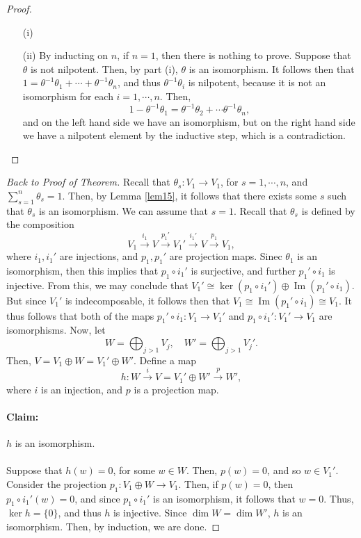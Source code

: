 \documentclass[a4paper]{report}
\theoremstyle{definition}
\theoremstyle{remark}
\theoremstyle{proposition}
\theoremstyle{conjecture}
\theoremstyle{lemma}
\theoremstyle{corollary}
\theoremstyle{exercise}
\theoremstyle{example}
\newcommand{\on}{\operatorname}
\begin{document}
\begin{proof}
    \leavevmode
    \begin{itemize}
        \item[(i)]
        \item[(ii)] By inducting on $n$, if $n=1$, then there is nothing
            to prove. Suppose that $\theta$ is not nilpotent.
            Then, by part (i), $\theta$ is an isomorphism.
            It follows then that 
            $1 = \theta^{-1}\theta_1 + \cdots + \theta^{-1}\theta_n$,
            and thus $\theta^{-1}\theta_i$ is nilpotent, because 
            it is not an isomorphism for each $i=1,\cdots,n$.
            Then, 
            $$1 - \theta^{-1}\theta_1 = \theta^{-1}\theta_2 + \cdots \theta^{-1}\theta_n,$$
            and on the left hand side we have an isomorphism, but on the right
            hand side we have a nilpotent element by the inductive step,
            which is a contradiction.
    \end{itemize}
\end{proof}

\begin{proof}[Back to Proof of Theorem]
    Recall that $\theta_s:V_1\to V_1$, for $s=1,\cdots,n$, and
    $\sum_{s=1}^n\theta_s = 1$. Then, by Lemma \ref{lem15}, it follows
    that there exists some $s$ such that $\theta_s$ is an isomorphism.
    We can assume that $s=1$.
    Recall that $\theta_s$ is defined by the composition
    $$V_1 \stackrel{i_1}{\longrightarrow} V \stackrel{p_1'}{\longrightarrow} V_1' \stackrel{i_1'}{\longrightarrow} V \stackrel{p_1}\longrightarrow V_1,$$
    where $i_1,i_1'$ are injections, and $p_1,p_1'$ are projection maps.
    Sinec $\theta_1$ is an isomorphism, then this implies that 
    $p_1\circ i_1'$ is surjective, and further $p_1'\circ i_1$ is injective.
    From this, we may conclude that $V_1' \cong  \ker(p_1\circ i_1') \oplus \on{Im}(p_1'\circ i_1).$
    But since $V_1'$ is indecomposable, it follows then that 
    $V_1 \cong \on{Im}(p_1'\circ i_1) \cong V_1$.
    It thus follows that both of the maps 
    $p_1'\circ i_1 : V_1 \to V_1'$ and $p_1\circ i_1' : V_1' \to V_1$ 
    are isomorphisms.
    Now, let 
    $$W = \bigoplus_{j>1}V_j,\quad W' = \bigoplus_{j>1}V_j'.$$
    Then, $V = V_1 \oplus W = V_1'\oplus W'$.
    Define a map
    $$h : W \stackrel{i}{\longrightarrow} V = V_1'\oplus W' \stackrel{p}{\longrightarrow} W',$$
    where $i$ is an injection, and $p$ is a projection map. 
    \paragraph{Claim:} $h$ is an isomorphism.\\\\
    Suppose that $h(w) = 0$, for some $w\in W$. Then, $p(w) = 0$, and 
    so $w\in V_1'$. 
    Consider the projection $p_1:  V_1 \oplus W \to V_1$.
    Then, if $p(w) = 0$, then $p_1\circ i_1'(w) = 0$, and since 
    $p_1\circ i_1'$ is an isomorphism, it follows that $w=0$.
    Thus, $\ker h = \lbrace 0 \rbrace$, and thus $h$ is injective.
    Since $\dim W = \dim W'$, $h$ is an isomorphism. Then, by induction, we 
    are done.
\end{proof}
\end{document}
